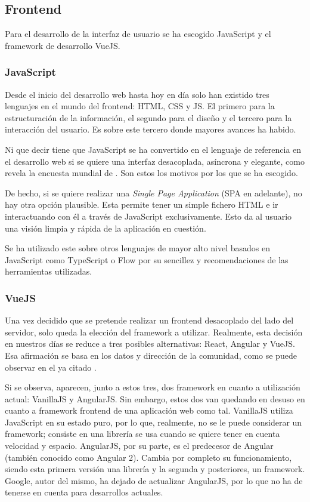 \subsection{Frontend}
Para el desarrollo de la interfaz de usuario se ha escogido JavaScript y el framework de desarrollo VueJS.

\subsubsection{JavaScript}
Desde el inicio del desarrollo web hasta hoy en día solo han existido tres lenguajes en el mundo del frontend: HTML, CSS y JS. El primero para la estructuración de la información, el segundo para el diseño y el tercero para la interacción del usuario. Es sobre este tercero donde mayores avances ha habido.

Ni que decir tiene que JavaScript se ha convertido en el lenguaje de referencia en el desarrollo web si se quiere una interfaz desacoplada, asíncrona y elegante, como revela la encuesta mundial de . Son estos los motivos por los que se ha escogido.

De hecho, si se quiere realizar una \textit{Single Page Application} (SPA en adelante), no hay otra opción plausible. Esta permite tener un simple fichero HTML e ir interactuando con él a través de JavaScript exclusivamente. Esto da al usuario una visión limpia y rápida de la aplicación en cuestión.

Se ha utilizado este sobre otros lenguajes de mayor alto nivel basados en JavaScript como TypeScript o Flow por su sencillez y recomendaciones de las herramientas utilizadas.

\subsubsection{VueJS}

Una vez decidido que se pretende realizar un frontend desacoplado del lado del servidor, solo queda la elección del framework a utilizar. Realmente, esta decisión en nuestros días se reduce a tres posibles alternativas: React, Angular y VueJS. Esa afirmación se basa en los datos y dirección de la comunidad, como se puede observar en el ya citado .

Si se observa, aparecen, junto a estos tres, dos framework en cuanto a utilización actual: VanillaJS y AngularJS. Sin embargo, estos dos van quedando en desuso en cuanto a framework frontend de una aplicación web como tal. VanillaJS utiliza JavaScript en su estado puro, por lo que, realmente, no se le puede considerar un framework; consiste en una librería se usa cuando se quiere tener en cuenta velocidad y espacio. AngularJS, por su parte, es el predecesor de Angular (también conocido como Angular 2). Cambia por completo su funcionamiento, siendo esta primera versión una librería y la segunda y posteriores, un framework. Google, autor del mismo, ha dejado de actualizar AngularJS, por lo que no ha de tenerse en cuenta para desarrollos actuales.

